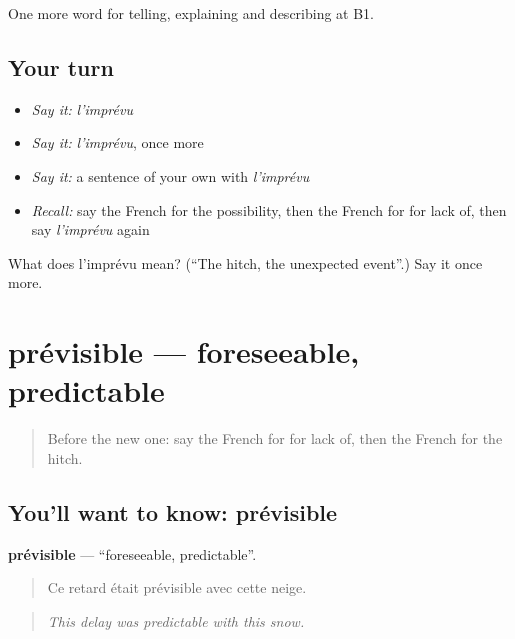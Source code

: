 \begin{grammarlens}[title={What you've built}]
One more word for telling, explaining and describing at B1.
\end{grammarlens}

\subsection*{Your turn}
\begin{itemize}
\raggedright
  \item \emph{Say it:} \emph{l'imprévu}
  \item \emph{Say it:} \emph{l'imprévu}, once more
  \item \emph{Say it:} a sentence of your own with \emph{l'imprévu}
  \item \emph{Recall:} say the French for the possibility, then the French for for lack of, then say \emph{l'imprévu} again
\end{itemize}

\begin{tcolorbox}[breakable,colback=teal!4,colframe=teal!35!black,title={Before you move on}]
What does l'imprévu mean? (\textquotedblleft{}The hitch, the unexpected event\textquotedblright{}.) Say it once more.
\end{tcolorbox}
\section[prévisible]{prévisible — foreseeable, predictable}

\label{lesson:FR-C370-previsible}



\begin{quote}
Before the new one: say the French for for lack of, then the French for the hitch.
\end{quote}

\subsection*{You'll want to know: prévisible}
\textbf{prévisible} — \textquotedblleft{}foreseeable, predictable\textquotedblright{}.

\begin{quote}
Ce retard était prévisible avec cette neige.
\end{quote}

\begin{quote}
\emph{This delay was predictable with this snow.}
\end{quote}

